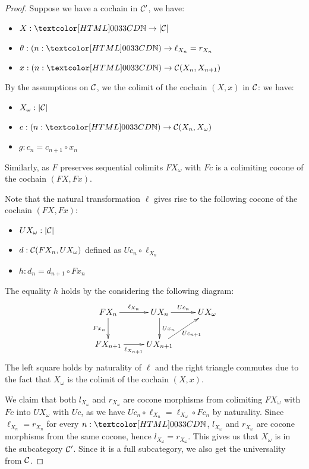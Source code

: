 \begin{proof}
  Suppose we have a cochain in $\mathcal{C}'$, \ie we have:
  \begin{itemize}
  \item $X : \natty \to | \Cc |$
  \item $\theta : (n : \natty) \to \ell_{X_n} = r_{X_n}$
  \item $x : (n : \natty) \to \Cc(X_n,X_{n+1})$
  \end{itemize}

  By the assumptions on $\mathcal{C}$, we the colimit of the cochain $(X,x)$ in $\mathcal{C}$: we have:
  \begin{itemize}
  \item $X_{\omega} : | \mathcal{C} |$
  \item $c : (n : \natty) \to \Cc(X_n, X_{\omega})$
  \item $g : c_n = c_{n+1} \circ x_n$
  \end{itemize}
  Similarly, as $F$ preserves sequential colimits $F X_{\omega}$ with
  $Fc$ is a colimiting cocone of the cochain $(FX, Fx)$.

  Note that the natural transformation $\ell$ gives rise to the
  following cocone of the cochain $(FX,Fx)$:
  \begin{itemize}
  \item $U X_{\omega} : | \mathcal{C} |$
  \item $d : \mathcal{C}(FX_n , UX_{\omega})$ defined as
    $U c_n \circ \ell_{X_n}$
    \item $h : d_n = d_{n+1} \circ Fx_n$
  \end{itemize}
  The equality $h$ holds by the considering the following diagram:
  $$
  \xymatrix{
    FX_n
    \ar[r]^{\ell_{X_n}}
    \ar[d]_{F x_n}
    &UX_n
    \ar[d]^{U x_n}
    \ar[r]^{U c_n}
    &UX_{\omega}
    \\
    FX_{n+1}
    \ar[r]_{\ell_{X_{n+1}}}
    &UX_{n+1}
    \ar[ru]_{U c_{n+1}}
  }
  $$
  The left square holds by naturality of $\ell$ and the right triangle
  commutes due to the fact that $X_{\omega}$ is the colimit of the
  cochain $(X,x)$.

  We claim that both $l_{X_{\omega}}$ and $r_{X_{\omega}}$ are cocone
  morphisms from colimiting $FX_{\omega}$ with $Fc$ into $UX_{\omega}$
  with $Uc$, as we have
  $Uc_n \circ \ell_{X_n} = \ell_{X_{\omega}} \circ Fc_n$ by
  naturality. Since $\ell_{X_n} = r_{X_n}$ for every $n : \natty$,
  $l_{X_{\omega}}$ and $r_{X_{\omega}}$ are cocone morphisms from the
  same cocone, hence $l_{X_{\omega}} = r_{X_{\omega}}$. This gives us
  that $X_{\omega}$ is in the subcategory $\mathcal{C}'$. Since it is a full
  subcategory, we also get the universality from $\mathcal{C}$.
\end{proof}

